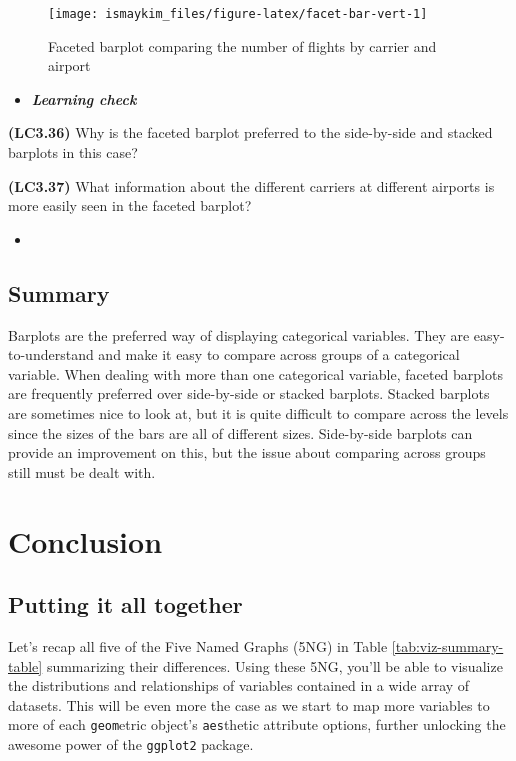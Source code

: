 \documentclass[12pt,]{krantz}
\newenvironment{rmdblock}[1]
  {\begin{shaded*}
  \begin{itemize}
  \renewcommand{\labelitemi}{
    \raisebox{-.7\height}[0pt][0pt]{
    }
  }
  \item
  }
  {
  \end{itemize}
  \end{shaded*}
  }
\newenvironment{learncheck}
  {\begin{rmdblock}{warning}}
  {\end{rmdblock}}
\theoremstyle{definition}
\theoremstyle{definition}
\theoremstyle{definition}
\theoremstyle{remark}
\begin{document}
\begin{figure}

{\centering \texttt{[image: ismaykim\_files/figure-latex/facet-bar-vert-1]} 

}

\caption{Faceted barplot comparing the number of flights by carrier and airport}\label{fig:facet-bar-vert}
\end{figure}

\begin{learncheck}
\textbf{\emph{Learning check}}
\end{learncheck}

\textbf{(LC3.36)} Why is the faceted barplot preferred to the
side-by-side and stacked barplots in this case?

\textbf{(LC3.37)} What information about the different carriers at
different airports is more easily seen in the faceted barplot?

\begin{learncheck}

\end{learncheck}

\subsection{Summary}\label{summary-4}

Barplots are the preferred way of displaying categorical variables. They
are easy-to-understand and make it easy to compare across groups of a
categorical variable. When dealing with more than one categorical
variable, faceted barplots are frequently preferred over side-by-side or
stacked barplots. Stacked barplots are sometimes nice to look at, but it
is quite difficult to compare across the levels since the sizes of the
bars are all of different sizes. Side-by-side barplots can provide an
improvement on this, but the issue about comparing across groups still
must be dealt with.

\section{Conclusion}\label{conclusion-1}

\subsection{Putting it all together}\label{putting-it-all-together}

Let's recap all five of the Five Named Graphs (5NG) in Table
\ref{tab:viz-summary-table} summarizing their differences. Using these
5NG, you'll be able to visualize the distributions and relationships of
variables contained in a wide array of datasets. This will be even more
the case as we start to map more variables to more of each
\texttt{geom}etric object's \texttt{aes}thetic attribute options,
further unlocking the awesome power of the \texttt{ggplot2} package.
\end{document}
